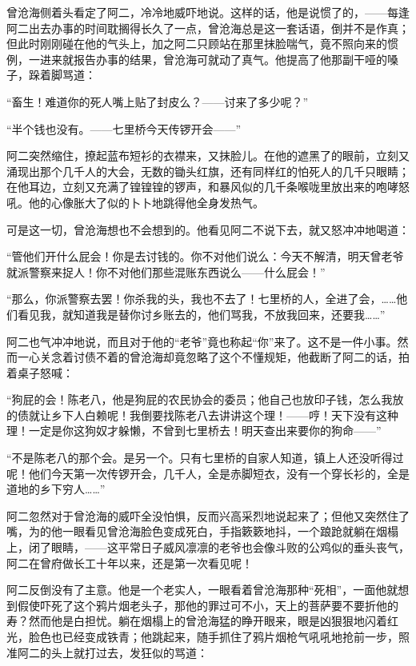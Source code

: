 \par 曾沧海侧着头看定了阿二，冷冷地威吓地说。这样的话，他是说惯了的，——每逢阿二出去办事的时间耽搁得长久了一点，曾沧海总是这一套话语，倒并不是作真；但此时刚刚碰在他的气头上，加之阿二只顾站在那里抹脸喘气，竟不照向来的惯例，一进来就报告办事的结果，曾沧海可就动了真气。他提高了他那副干哑的嗓子，跺着脚骂道：
\par “畜生！难道你的死人嘴上贴了封皮么？——讨来了多少呢？”
\par “半个钱也没有。——七里桥今天传锣开会——”
\par 阿二突然缩住，撩起蓝布短衫的衣襟来，又抹脸儿。在他的遮黑了的眼前，立刻又涌现出那个几千人的大会，无数的锄头红旗，还有同样红的怕死人的几千只眼睛；在他耳边，立刻又充满了锽锽锽的锣声，和暴风似的几千条喉咙里放出来的咆哮怒吼。他的心像胀大了似的卜卜地跳得他全身发热气。
\par 可是这一切，曾沧海想也不会想到的。他看见阿二不说下去，就又怒冲冲地喝道：
\par “管他们开什么屁会！你是去讨钱的。你不对他们说么：今天不解清，明天曾老爷就派警察来捉人！你不对他们那些混账东西说么——什么屁会！”
\par “那么，你派警察去罢！你杀我的头，我也不去了！七里桥的人，全进了会，……他们看见我，就知道我是替你讨乡账去的，他们骂我，不放我回来，还要我……”
\par 阿二也气冲冲地说，而且对于他的“老爷”竟也称起“你”来了。这不是一件小事。然而一心关念着讨债不着的曾沧海却竟忽略了这个不懂规矩，他截断了阿二的话，拍着桌子怒喊：
\par “狗屁的会！陈老八，他是狗屁的农民协会的委员；他自己也放印子钱，怎么我放的债就让乡下人白赖呢！我倒要找陈老八去讲讲这个理！——哼！天下没有这种理！一定是你这狗奴才躲懒，不曾到七里桥去！明天查出来要你的狗命——”
\par “不是陈老八的那个会。是另一个。只有七里桥的自家人知道，镇上人还没听得过呢！他们今天第一次传锣开会，几千人，全是赤脚短衣，没有一个穿长衫的，全是道地的乡下穷人……”
\par 阿二忽然对于曾沧海的威吓全没怕惧，反而兴高采烈地说起来了；但他又突然住了嘴，为的他一眼看见曾沧海脸色变成死白，手指簌簌地抖，一个踉跄就躺在烟榻上，闭了眼睛，——这平常日子威风凛凛的老爷也会像斗败的公鸡似的垂头丧气，阿二在曾府做长工十年以来，还是第一次看见呢！
\par 阿二反倒没有了主意。他是一个老实人，一眼看着曾沧海那种“死相”，一面他就想到假使吓死了这个鸦片烟老头子，那他的罪过可不小，天上的菩萨要不要折他的寿？然而他是白担忧。躺在烟榻上的曾沧海猛的睁开眼来，眼是凶狠狠地闪着红光，脸色也已经变成铁青；他跳起来，随手抓住了鸦片烟枪气吼吼地抢前一步，照准阿二的头上就打过去，发狂似的骂道：
